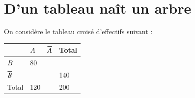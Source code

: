 \documentclass[oneside,12pt]{exam}          %
\begin{document}
\newpage
{}



\section{D'un tableau naît un arbre}
On considère le tableau croisé d'effectifs suivant :
\begin{center}
	\renewcommand{\arraystretch}{1.75}
    \begin{tabular}{| P{4cm} | P{3cm} | P{3cm} | P{3cm} |}\hline
		 & $A$ & ${\overline{A}}$ & Total\\ \hline
	    $B$ & 80 &  &  \\ \hline
	    ${\overline{B}}$ &  &  & 140 \\ \hline
	    Total & 120 &  & 200 \\ \hline
    \end{tabular}
\end{center}
\end{document}
